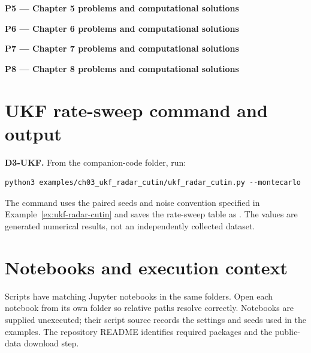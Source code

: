 \par\medskip{}\label{code:P5}
\noindent\textbf{P5 --- Chapter 5 problems and computational solutions}\par
\noindent{}\par

\par\medskip{}\label{code:P6}
\noindent\textbf{P6 --- Chapter 6 problems and computational solutions}\par
\noindent{}\par

\par\medskip{}\label{code:P7}
\noindent\textbf{P7 --- Chapter 7 problems and computational solutions}\par
\noindent{}\par

\par\medskip{}\label{code:P8}
\noindent\textbf{P8 --- Chapter 8 problems and computational solutions}\par
\noindent{}\par

\section*{UKF rate-sweep command and output}
\label{code:D3-UKF}
\textbf{D3-UKF.} From the companion-code folder, run:
\begin{lstlisting}
python3 examples/ch03_ukf_radar_cutin/ukf_radar_cutin.py --montecarlo
\end{lstlisting}
The command uses the paired seeds and noise convention specified in Example~\ref{ex:ukf-radar-cutin} and saves the rate-sweep table as
.
The values are generated numerical results, not an independently collected dataset.

\section*{Notebooks and execution context}
Scripts have matching Jupyter notebooks in the same folders. Open each notebook from its own folder so relative paths resolve correctly. Notebooks are supplied unexecuted; their script source records the settings and seeds used in the examples. The repository README identifies required packages and the public-data download step.
